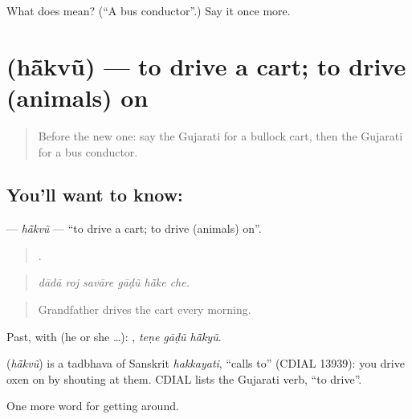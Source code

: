 \begin{tcolorbox}[breakable,colback=teal!4,colframe=teal!35!black,title={Before you move on}]
What does  mean? (\textquotedblleft{}A bus conductor\textquotedblright{}.) Say it once more.
\end{tcolorbox}
\section[\texorpdfstring{\gu{હાંકવું} (hā̃kvũ)}{હાંકવું (hā̃kvũ)}]{ (hā̃kvũ) — to drive a cart; to drive (animals) on}

\label{lesson:GU-C402-hakvu}



\begin{quote}
Before the new one: say the Gujarati for a bullock cart, then the Gujarati for a bus conductor.
\end{quote}

\subsection*{You'll want to know: }
\textbf{} — \emph{hā̃kvũ} — \textquotedblleft{}to drive a cart; to drive (animals) on\textquotedblright{}.

\begin{quote}
     .
\end{quote}

\begin{quote}
\emph{dādā roj savāre gāḍũ hā̃ke che.}
\end{quote}

\begin{quote}
Grandfather drives the cart every morning.
\end{quote}

Past, with  (he or she …):   , \emph{teṇe gāḍũ hā̃kyũ}.

\begin{cousinweb}
\textbf{} (\emph{hā̃kvũ}) is a tadbhava of Sanskrit \emph{hakkayati}, \textquotedblleft{}calls to\textquotedblright{} (CDIAL 13939): you drive oxen on by shouting at them. CDIAL lists the Gujarati verb, \textquotedblleft{}to drive\textquotedblright{}.
\end{cousinweb}

\begin{grammarlens}[title={What you've built}]
One more word for getting around.
\end{grammarlens}

